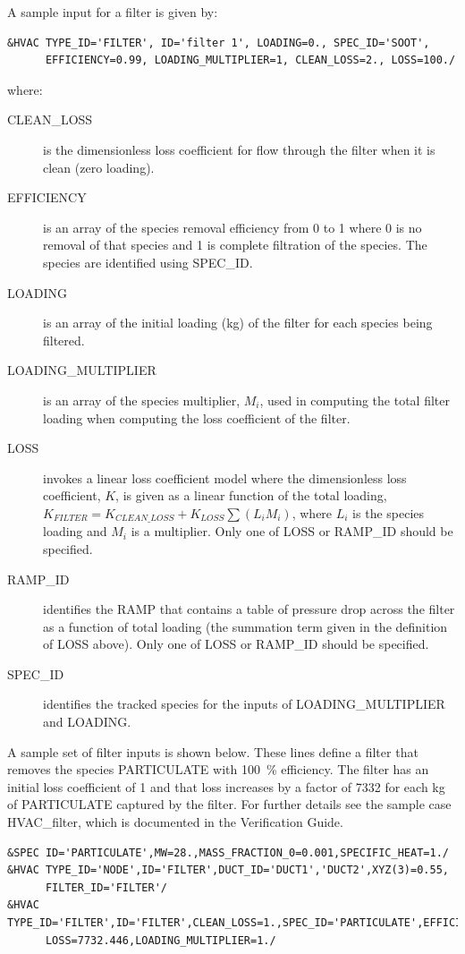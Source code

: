 \documentclass[11pt]{book}
\begin{document}
A sample input for a filter is given by:
\begin{lstlisting}
&HVAC TYPE_ID='FILTER', ID='filter 1', LOADING=0., SPEC_ID='SOOT',
      EFFICIENCY=0.99, LOADING_MULTIPLIER=1, CLEAN_LOSS=2., LOSS=100./
\end{lstlisting}
where:
\begin{description}
\item[{\ct CLEAN\_LOSS}] is the dimensionless loss coefficient for flow through the filter when it is clean (zero loading).
\item[{\ct EFFICIENCY}] is an array of the species removal efficiency from 0 to 1 where 0 is no removal of that species and 1 is complete filtration of the species.  The species are identified using {\ct SPEC\_ID}.
\item[{\ct LOADING}] is an array of the initial loading (kg) of the filter for each species being filtered.
\item[{\ct LOADING\_MULTIPLIER}] is an array of the species multiplier, $M_i$, used in computing the total filter loading when computing the loss coefficient of the filter.
\item[{\ct LOSS}] invokes a linear loss coefficient model where the dimensionless loss coefficient, $K$, is given as a linear function of the total loading, $K_{\si{FILTER}}=K_{\si{CLEAN\_LOSS}}+K_{\si{LOSS}} \sum \left( L_i M_i \right)$, where $L_i$ is the species loading and $M_i$ is a multiplier.  Only one of {\ct LOSS} or {\ct RAMP\_ID} should be specified.
\item[{\ct RAMP\_ID}] identifies the {\ct RAMP} that contains a table of pressure drop across the filter as a function of total loading (the summation term given in the definition of {\ct LOSS} above).   Only one of {\ct LOSS} or {\ct RAMP\_ID} should be specified.
\item[{\ct SPEC\_ID}] identifies the tracked species for the inputs of {\ct LOADING\_MULTIPLIER} and {\ct LOADING}.
\end{description}
A sample set of filter inputs is shown below.  These lines define a filter that removes the species {\ct PARTICULATE} with 100~\% efficiency.  The filter has an initial loss coefficient of 1 and that loss increases by a factor of 7332 for each kg of {\ct PARTICULATE} captured by the filter.  For further details see the sample case {\ct HVAC\_filter}, which is documented in the Verification Guide.

\begin{lstlisting}
&SPEC ID='PARTICULATE',MW=28.,MASS_FRACTION_0=0.001,SPECIFIC_HEAT=1./
&HVAC TYPE_ID='NODE',ID='FILTER',DUCT_ID='DUCT1','DUCT2',XYZ(3)=0.55,
      FILTER_ID='FILTER'/
&HVAC TYPE_ID='FILTER',ID='FILTER',CLEAN_LOSS=1.,SPEC_ID='PARTICULATE',EFFICIENCY=1.,
      LOSS=7732.446,LOADING_MULTIPLIER=1./
\end{lstlisting}
\end{document}
